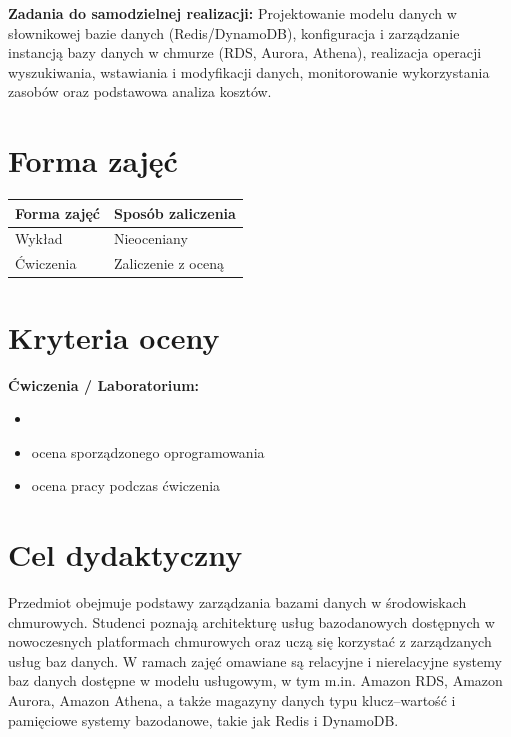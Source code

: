 \documentclass[12pt, a4paper]{article}
\newcommand{\thdrule}{\noalign{\global\setlength{\extrarowheight}{0pt}}}
\newcommand{\thdend}{\noalign{\global\setlength{\extrarowheight}{3pt}}}
\begin{document}
\vspace{4pt}
\noindent\textbf{Zadania do samodzielnej realizacji:} Projektowanie modelu danych w słownikowej bazie danych (Redis/DynamoDB), konfiguracja i zarządzanie instancją bazy danych w chmurze (RDS, Aurora, Athena), realizacja operacji wyszukiwania, wstawiania i modyfikacji danych, monitorowanie wykorzystania zasobów oraz podstawowa analiza kosztów.

\section{Forma zajęć}

\begin{center}
{\scriptsize
\begin{tabular}{m{5cm}m{8cm}}
\thdrule\toprule
\rowcolor{pjatkRed} {\color{white}\textbf{Forma zajęć}} & {\color{white}\textbf{Sposób zaliczenia}} \\
\midrule\thdend
  \rowcolor{tableRowLight} Wykład & Nieoceniany \\
  \rowcolor{tableRowAlt} Ćwiczenia & Zaliczenie z oceną \\
\bottomrule
\end{tabular}}
\end{center}

\section{Kryteria oceny}

\textbf{Ćwiczenia / Laboratorium:}
\begin{itemize}
  \item 
  \item ocena sporządzonego oprogramowania
  \item ocena pracy podczas ćwiczenia
\end{itemize}


\section{Cel dydaktyczny}

Przedmiot obejmuje podstawy zarządzania bazami danych w środowiskach chmurowych. Studenci poznają architekturę usług bazodanowych dostępnych w nowoczesnych platformach chmurowych oraz uczą się korzystać z zarządzanych usług baz danych. W ramach zajęć omawiane są relacyjne i nierelacyjne systemy baz danych dostępne w modelu usługowym, w tym m.in. Amazon RDS, Amazon Aurora, Amazon Athena, a także magazyny danych typu klucz–wartość i pamięciowe systemy bazodanowe, takie jak Redis i DynamoDB.
\end{document}
